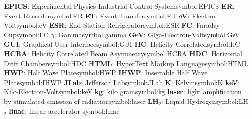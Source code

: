 \begin{tabbing}
\hspace{-0.27cm}
\addsymbol \textbf{EPICS}: {Experimental Physics Industrial Control System}{symbol:EPICS}
\hspace{-0.27cm}
\addsymbol \textbf{ER}: {Event Recorder}{symbol:ER}
\hspace{-0.27cm}
\addsymbol \textbf{ET}: {Event Transfer}{symbol:ET}
\hspace{-0.27cm}
\addsymbol \textbf{eV}: {Electron-Volt}{symbol:eV}
\hspace{-0.27cm}
\addsymbol \textbf{ESR}: {End Station Refrigerator}{symbol:ESR}
\hspace{-0.27cm}
\addsymbol \textbf{FC}: {Faraday Cup}{symbol:FC}
\hspace{-0.27cm}
\addsymbol \textbf{$\gamma$}: {Gamma}{symbol:gamma}
\hspace{-0.27cm}
\addsymbol \textbf{GeV}: {Giga-Electron-Volt}{symbol:GeV}
\hspace{-0.27cm}
\addsymbol \textbf{GUI}: {Graphical User Interface}{symbol:GUI}
\hspace{-0.27cm}
\addsymbol \textbf{HC}: {Helicity Correlated}{symbol:HC}
\hspace{-0.27cm}
\addsymbol \textbf{HCBA}: {Helicity Correlated Beam Asymmetry}{symbol:HCBA}
\hspace{-0.27cm}
\addsymbol \textbf{HDC}: {Horizontal Drift Chamber}{symbol:HDC}
\hspace{-0.27cm}
\addsymbol \textbf{HTML}: {HyperText Markup Language}{symbol:HTML}
\hspace{-0.27cm}
\addsymbol \textbf{HWP}: {Half Wave Plate}{symbol:HWP}
\hspace{-0.27cm}
\addsymbol \textbf{IHWP}: {Insertable Half Wave Plate}{symbol:IHWP}
\hspace{-0.27cm}
\addsymbol \textbf{JLab}: {Jefferson Lab}{symbol:JLab}
\hspace{-0.27cm}
\addsymbol \textbf{K}: {Kelvin}{symbol:K}
\hspace{-0.27cm}
\addsymbol \textbf{keV}: {Kilo-Electron-Volt}{symbol:keV}
\hspace{-0.27cm}
\addsymbol \textbf{kg}: {kilo gram}{symbol:kg}
\hspace{-0.27cm}
\addsymbol \textbf{laser}: {light amplification by stimulated emission of radiation}{symbol:laser}
\hspace{-0.27cm}
\addsymbol \textbf{LH$_2$}: {Liquid Hydrogen}{symbol:LH$_2$}
\hspace{-0.27cm}
\addsymbol \textbf{linac}: {linear accelerator} {symbol:linac}
\hspace{-0.27cm}

\end{tabbing}

